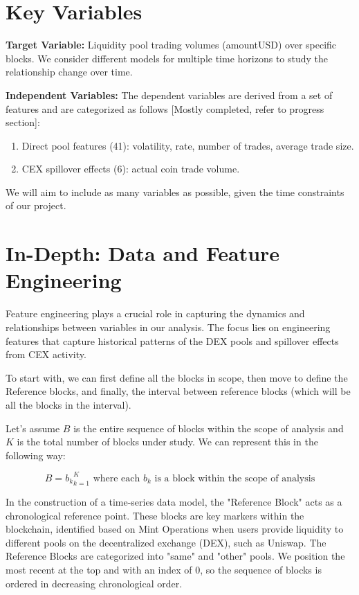 \documentclass{article}
\begin{document}
{\section*{Key Variables}
\textbf{Target Variable:} Liquidity pool trading volumes (amountUSD) over specific blocks. We consider different models for multiple time horizons to study the relationship change over time.

\textbf{Independent Variables:}
The dependent variables are derived from a set of features and are categorized as follows [Mostly completed, refer to progress section]:
\begin{enumerate}[label=\arabic*. ,itemsep=0pt, topsep=0pt]
\item Direct pool features (41): volatility, rate, number of trades, average trade size.
\item CEX spillover effects (6): actual coin trade volume.
\end{enumerate}

We will aim to include as many variables as possible, given the time constraints of our project.




\section*{\textbf{In-Depth: Data and Feature Engineering}}

Feature engineering plays a crucial role in capturing the dynamics and relationships between variables in our analysis. The focus lies on engineering features that capture historical patterns of the DEX pools and spillover effects from CEX activity.

To start with, we can first define all the blocks in scope, then move to define the Reference blocks, and finally, the interval between reference blocks (which will be all the blocks in the interval).

Let's assume $B$ is the entire sequence of blocks within the scope of analysis and $K$ is the total number of blocks under study. We can represent this in the following way:

\begin{equation}
B = {b_k}_{k=1}^{K} \text{ where each } b_k \text{ is a block within the scope of analysis}
\end{equation}

In the construction of a time-series data model, the "Reference Block" acts as a chronological reference point. These blocks are key markers within the blockchain, identified based on Mint Operations when users provide liquidity to different pools on the decentralized exchange (DEX), such as Uniswap. The Reference Blocks are categorized into "same" and "other" pools. We position the most recent at the top and with an index of 0, so the sequence of blocks is ordered in decreasing chronological order.

}
\end{document}
